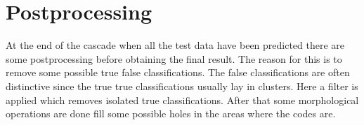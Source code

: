 \section{Postprocessing}
\label{Postprocessing}
At the end of the cascade when all the test data have been predicted there are some postprocessing before obtaining the final result. The reason for this is to remove some possible true false classifications. The false classifications are often distinctive since the true true classifications usually lay in clusters. Here a filter is applied which removes isolated true classifications. After that some morphological operations are done fill some possible holes in the areas where the codes are.
